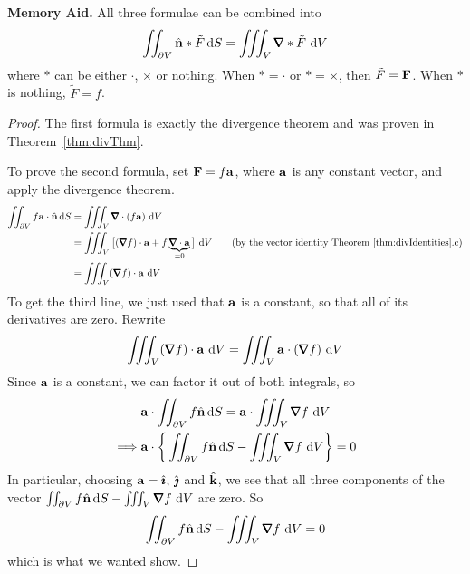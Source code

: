 \noindent\textbf{Memory Aid.} All three formulae can be combined into
\begin{equation*}
\dblInt_{\partial V} \hn *\tilde F\,\dee{S}
=\tripInt_V\vnabla *\tilde F\ \dee{V}
\end{equation*}
where $*$ can be either $\cdot$, $\times$ or nothing. 
When $*=\cdot$ or $*=\times$, then $\tilde F=\mathbf{F}$. When $*$ is nothing,
$\tilde F=f$. 

\begin{proof}
The first formula is exactly the divergence theorem and was proven 
in Theorem~\ref{thm:divThm}.

\medskip
\noindent
To prove the second formula, set $\mathbf{F}=f\mathbf{a}$, where $\mathbf{a}$ is any constant 
vector, and apply the divergence theorem.
\begin{align*}
\dblInt_{\partial V} f\va\cdot\hn\,\dee{S}
&=\tripInt_V\vnabla\cdot(f\va)\ \dee{V} \\
&=\tripInt_V\big[(\vnabla f)\cdot\va
+f\underbrace{\vnabla\cdot\va}_{=0}\big]\ \dee{V} 
\qquad\text{(by the vector identity Theorem \ref{thm:divIdentities}.c)} \\
&=\tripInt_V(\vnabla f)\cdot\va\ \dee{V}
\end{align*}
To get the third line, we just used that $\mathbf{a}$ is a constant, so that 
all of its derivatives are zero. Rewrite
\begin{equation*}
\tripInt_V(\vnabla f)\cdot\va\ \dee{V}
=\tripInt_V\va\cdot(\vnabla f)\ \dee{V}
\end{equation*}
Since $\mathbf{a}$ is a constant, we can factor
it out of both integrals, so
\begin{align*}
&\va\cdot\dblInt_{\partial V} f\hn\,\dee{S}
=\va\cdot\tripInt_V\vnabla f\ \dee{V} \\
\implies &\va\cdot\bigg\{\dblInt_{\partial V} f\hn\,\dee{S}
-\tripInt_V\vnabla f\ \dee{V}\bigg\}=0
\end{align*}
In particular, choosing $\mathbf{a}=\hat{\pmb{\imath}}$, $\hat{\pmb{\jmath}}$ and $\hat{\mathbf{k}}$, we see that
all three components of the vector $\dblInt_{\partial V} f\hn\,\dee{S}
-\tripInt_V\vnabla f\ \dee{V}$ are zero. So 
\begin{equation*}
\dblInt_{\partial V} f\hn\,\dee{S}
-\tripInt_V\vnabla f\ \dee{V}=0
\end{equation*}
which is what we wanted show.



\end{proof}
